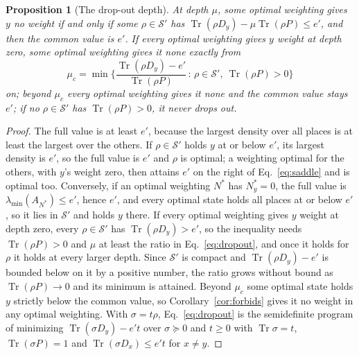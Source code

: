 \documentclass[aps,prd,reprint,superscriptaddress]{revtex4-2}
\newtheorem{proposition}{Proposition}
\begin{document}
\begin{proposition}[The drop-out depth]\label{prop:dropout}
At depth $\mu$, some optimal weighting gives $y$ no weight if and only if some $\rho \in \mathcal{S}'$ has $\operatorname{Tr}(\rho D_y) - \mu \operatorname{Tr}(\rho P) \le e'$, and then the common value is $e'$. If every optimal weighting gives $y$ weight at depth zero, some optimal weighting gives it none exactly from
\begin{equation}
  \mu_c = \min\Big\{ \frac{\operatorname{Tr}(\rho D_y) - e'}{\operatorname{Tr}(\rho P)} \,:\, \rho \in \mathcal{S}',\ \operatorname{Tr}(\rho P) > 0 \Big\}
  \label{eq:dropout}
\end{equation}
on; beyond $\mu_c$ every optimal weighting gives it none and the common value stays $e'$; if no $\rho \in \mathcal{S}'$ has $\operatorname{Tr}(\rho P) > 0$, it never drops out.
\end{proposition}
\begin{proof}
The full value is at least $e'$, because the largest density over all places is at least the largest over the others. If $\rho \in \mathcal{S}'$ holds $y$ at or below $e'$, its largest density is $e'$, so the full value is $e'$ and $\rho$ is optimal; a weighting optimal for the others, with $y$'s weight zero, then attains $e'$ on the right of Eq.~\eqref{eq:saddle} and is optimal too. Conversely, if an optimal weighting $N^*$ has $N^*_y = 0$, the full value is $\lambda_{\min}(A_{N^*}) \le e'$, hence $e'$, and every optimal state holds all places at or below $e'$, so it lies in $\mathcal{S}'$ and holds $y$ there. If every optimal weighting gives $y$ weight at depth zero, every $\rho \in \mathcal{S}'$ has $\operatorname{Tr}(\rho D_y) > e'$, so the inequality needs $\operatorname{Tr}(\rho P) > 0$ and $\mu$ at least the ratio in Eq.~\eqref{eq:dropout}, and once it holds for $\rho$ it holds at every larger depth. Since $\mathcal{S}'$ is compact and $\operatorname{Tr}(\rho D_y) - e'$ is bounded below on it by a positive number, the ratio grows without bound as $\operatorname{Tr}(\rho P) \to 0$ and its minimum is attained. Beyond $\mu_c$ some optimal state holds $y$ strictly below the common value, so Corollary~\ref{cor:forbids} gives it no weight in any optimal weighting. With $\sigma = t\rho$, Eq.~\eqref{eq:dropout} is the semidefinite program of minimizing $\operatorname{Tr}(\sigma D_y) - e' t$ over $\sigma \succeq 0$ and $t \ge 0$ with $\operatorname{Tr}\sigma = t$, $\operatorname{Tr}(\sigma P) = 1$ and $\operatorname{Tr}(\sigma D_x) \le e' t$ for $x \neq y$.
\end{proof}
\end{document}
